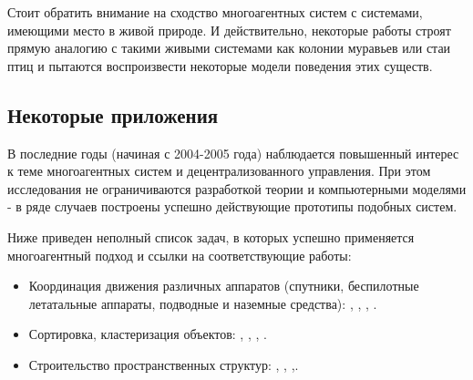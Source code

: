 Стоит обратить внимание на сходство многоагентных систем с системами, имеющими место в живой природе. И действительно, некоторые работы строят прямую аналогию с  такими живыми системами как колонии муравьев или стаи птиц и пытаются воспроизвести некоторые модели поведения этих существ.

\subsection*{Некоторые приложения}

В последние годы (начиная с 2004-2005 года) наблюдается
повышенный интерес к теме многоагентных систем и
децентрализованного управления. При этом исследования
не ограничиваются разработкой теории и компьютерными
моделями - в ряде случаев построены успешно
действующие прототипы подобных систем. 

Ниже приведен неполный список задач, в которых успешно  применяется многоагентный подход и ссылки на соответствующие работы:
\begin{itemize}
\item Координация движения различных аппаратов (спутники, беспилотные летатальные аппараты, подводные и наземные средства): \cite{lafferriere2005decentralized}, \cite{veerman2005flocks}, \cite{vasarhelyi2014outdoor}, \cite{williams2005stable}.
\item Сортировка, кластеризация объектов: \cite{deneubourg1991dynamics}, \cite{ding2014sorting}, \cite{kabla2012collective}, \cite{santos2014segregation}.
\item Строительство пространственных структур: \cite{pennisi2014cooperative}, \cite{petersen2014collective}, \cite{augugliaro2013building},\cite{lindsey2011construction}.
\end{itemize}

\clearpage